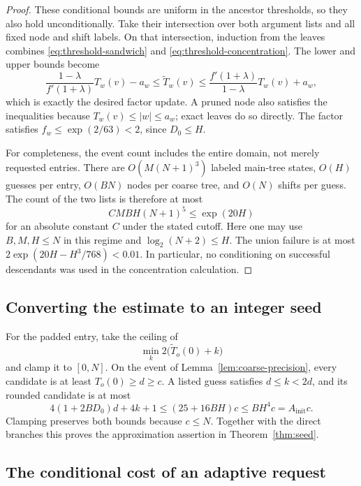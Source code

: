 \begin{proof}
These conditional bounds are uniform in the ancestor thresholds, so they
also hold unconditionally.  Take their intersection over both argument
lists and all fixed node and shift labels.  On that intersection, induction
from the leaves combines \eqref{eq:threshold-sandwich} and
\eqref{eq:threshold-concentration}.  The lower and upper bounds become
\[
 \frac{1-\lambda}{f'(1+\lambda)}T_w(v)-a_w
 \le\widetilde T_w(v)
 \le\frac{f'(1+\lambda)}{1-\lambda}T_w(v)+a_w,
\]
which is exactly the desired factor update.  A pruned node also satisfies
the inequalities because $T_w(v)\le |w|\le a_w$; exact leaves do so directly.
The factor satisfies $f_w\le\exp(2/63)<2$, since $D_0\le H$.

For completeness, the event count includes the entire domain, not merely
requested entries.  There are $O(M(N+1)^3)$ labeled main-tree states, $O(H)$
guesses per entry, $O(BN)$ nodes per coarse tree, and $O(N)$ shifts per guess.
The count of the two lists is therefore at most
\[
 CMBH(N+1)^5\le\exp(20H)
\]
for an absolute constant $C$ under the stated cutoff.  Here one may use
$B,M,H\le N$ in this regime and $\log_2(N+2)\le H$.  The union failure is at
most $2\exp(20H-H^3/768)<0.01$.  In particular, no conditioning on successful
descendants was used in the concentration calculation.
\end{proof}

\subsection{Converting the estimate to an integer seed}

For the padded entry, take the ceiling of
\begin{equation}\label{eq:initial-output}
 \min_k 2\bigl(\widetilde T_o(0)+k\bigr)
\end{equation}
and clamp it to $[0,N]$.  On the event of Lemma~\ref{lem:coarse-precision},
every candidate is at least $T_o(0)\ge d\ge c$.  A listed guess satisfies
$d\le k<2d$, and its rounded candidate is at most
\[
 4(1+2BD_0)d+4k+1
 \le (25+16BH)c
 \le BH^4c=A_{\mathrm{init}}c.
\]
Clamping preserves both bounds because $c\le N$.  Together with the direct
branches this proves the approximation assertion in Theorem~\ref{thm:seed}.

\subsection{The conditional cost of an adaptive request}

